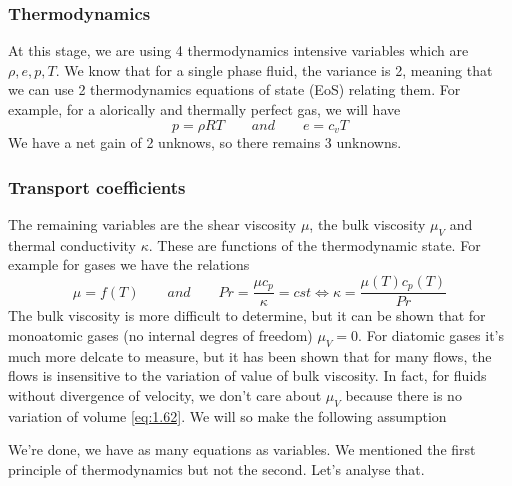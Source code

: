 	\subsubsection{Thermodynamics}
		At this stage, we are using 4 thermodynamics intensive variables which are $\rho, e, p, T$. We know that for a single phase fluid, the variance is 2, meaning that we can use 2 thermodynamics equations of state (EoS) relating them. For example, for a alorically and thermally perfect gas, we will have 
		\begin{equation}
			p = \rho R T \qquad and \qquad e = c_v T
		\end{equation}		 
		We have a net gain of 2 unknows, so there remains 3 unknowns.  
		
	\subsubsection{Transport coefficients}
		The remaining variables are the shear viscosity $\mu$, the bulk viscosity $\mu _V$ and thermal conductivity $\kappa$. These are functions of the thermodynamic state. For example for gases we have the relations 
		\begin{equation}
			\mu = f(T) \qquad and \qquad Pr = \frac{\mu c_p}{\kappa} = cst \Leftrightarrow \kappa = \frac{\mu (T) c_p (T)}{Pr}
		\end{equation}
		The bulk viscosity is more difficult to determine, but it can be shown that for monoatomic gases (no internal degres of freedom) $\mu _V=0$. For diatomic gases it's much more delcate to measure, but it has been shown that for many flows, the flows is insensitive to the variation of value of bulk viscosity. In fact, for fluids without divergence of velocity, we don't care about $\mu _V$ because there is no variation of volume  \eqref{eq:1.62}. We will so make the following assumption
		\begin{center}
		\end{center}
		 We're done, we have as many equations as variables. We mentioned the first principle of thermodynamics but not the second. Let's analyse that. 
		 
